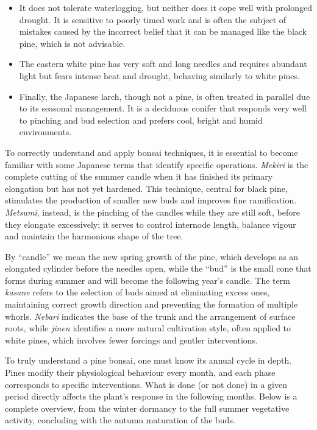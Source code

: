 \begin{itemize}
    \item[] It does not tolerate waterlogging, but neither does it cope well with prolonged drought.
    It is sensitive to poorly timed work and is often the subject of mistakes caused by the incorrect belief that it can be managed like the black pine, which is not advisable.

    \item The eastern white pine has very soft and long needles and requires abundant light but fears intense heat and drought, behaving similarly to white pines.

    \item Finally, the Japanese larch, though not a pine, is often treated in parallel due to its seasonal management.
    It is a deciduous conifer that responds very well to pinching and bud selection and prefers cool, bright and humid environments.
\end{itemize}

\medskip
{}
\label{glossario}
\noindent
To correctly understand and apply bonsai techniques, it is essential to become familiar with some Japanese terms that identify specific operations.
\textit{Mekiri} is the complete cutting of the summer candle when it has finished its primary elongation but has not yet hardened.
This technique, central for black pine, stimulates the production of smaller new buds and improves fine ramification.
\textit{Metsumi}, instead, is the pinching of the candles while they are still soft, before they elongate excessively; it serves to control internode length, balance vigour and maintain the harmonious shape of the tree.

By ``candle'' we mean the new spring growth of the pine, which develops as an elongated cylinder before the needles open, while the ``bud'' is the small cone that forms during summer and will become the following year's candle.
The term \textit{kasane} refers to the selection of buds aimed at eliminating excess ones, maintaining correct growth direction and preventing the formation of multiple whorls.
\textit{Nebari} indicates the base of the trunk and the arrangement of surface roots, while \textit{jinen} identifies a more natural cultivation style, often applied to white pines, which involves fewer forcings and gentler interventions.
\columnbreak

{}
\label{ciclo_annuale}
\noindent
To truly understand a pine bonsai, one must know its annual cycle in depth.
Pines modify their physiological behaviour every month, and each phase corresponds to specific interventions.
What is done (or not done) in a given period directly affects the plant's response in the following months.
Below is a complete overview, from the winter dormancy to the full summer vegetative activity, concluding with the autumn maturation of the buds.


